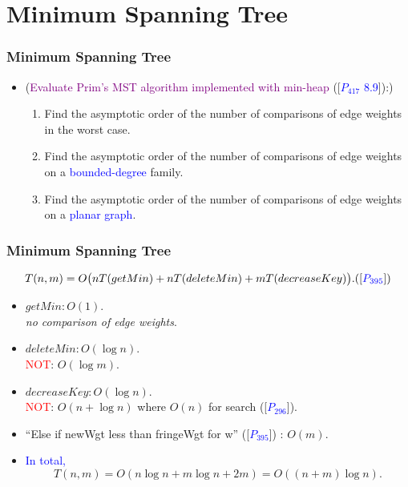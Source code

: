 
\section{Minimum Spanning Tree}

\begin{frame}
  \frametitle{Minimum Spanning Tree}

    \begin{itemize}

    \item (\textcolor{purple}{Evaluate Prim's MST algorithm implemented with min-heap} ([\textcolor{blue}{$P_{417}$ 8.9}]):) \\
        \begin{enumerate}
          \item Find the asymptotic order of the number of comparisons of edge weights in the worst case.
          \item Find the asymptotic order of the number of comparisons of edge weights on a \textcolor{blue}{bounded-degree} family.
          \item Find the asymptotic order of the number of comparisons of edge weights on a \textcolor{blue}{planar graph}.
        \end{enumerate}

    \end{itemize}

\end{frame}



\begin{frame}
  \frametitle{Minimum Spanning Tree}

    \[
      T(n,m) = O \big (nT(getMin) + nT(deleteMin) + mT(decreaseKey) \big ). (\lbrack \textcolor{blue}{P_{395}} \rbrack)
    \]

    \pause

    \begin{itemize}
      \item $getMin: O(1)$.  \\  \emph{no comparison of edge weights}.
      \item $deleteMin: O(\log n)$.  \\  \textcolor{red}{NOT}: $O(\log m)$.
      \item $decreaseKey: O(\log n)$.  \\ \textcolor{red}{NOT}: $O(n + \log n)$ where $O(n)$ for search ([\textcolor{blue}{$P_{296}$}]).
      \item ``Else if newWgt less than fringeWgt for w'' ([\textcolor{blue}{$P_{395}$}]) : $O(m).$
      \item \textcolor{blue}{In total,}
      \[
      T(n,m) = O(n \log n + m \log n + 2m) = O((n+m) \log n).
      \]
    \end{itemize}

\end{frame}




